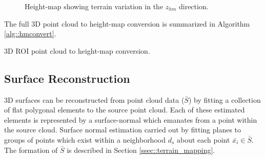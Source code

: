 				\begin{figure}[h!]
					\centering
					\caption{Height-map showing terrain variation in the $z_{hm}$ direction.}
					\label{fig::heightmap_terrain_patch_ortho}
				\end{figure}							
			The full 3D point cloud to height-map conversion is summarized in Algorithm \ref{alg::hmconvert}.
			\begin{algorithm}[!h]
				\begin{algorithmic}
						\EndIf
					\EndFor
				\end{algorithmic}	
				\caption{3D ROI point cloud to height-map conversion.}
				\label{alg::hmconvert}
			\end{algorithm}

		\subsection{Surface Reconstruction}

			3D surfaces can be reconstructed from point cloud data ($\bar{S}$) by fitting a collection of flat polygonal elements to the source point cloud. Each of these estimated elements is represented by a surface-normal which emanates from a point within the source cloud. Surface normal estimation carried out by fitting planes to groups of points which exist within a neighborhood $d_{s}$ about each point $\bar{x_{i}}\in\bar{S}$. The formation of $\bar{S}$ is described in Section \ref{ssec::terrain_mapping}.

